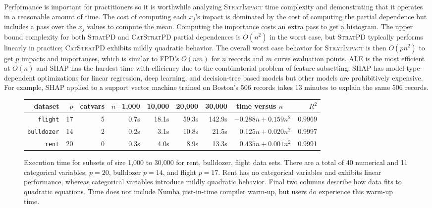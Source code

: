 \documentclass[11pt]{article}
\newcommand{\simp}{\fontfamily{cmr}\textsc{\small StratImpact}}
\newcommand{\spd}{\fontfamily{cmr}\textsc{\small StratPD}}
\newcommand{\cspd}{\fontfamily{cmr}\textsc{\small CatStratPD}}
\begin{document}
Performance is important for practitioners so it is worthwhile analyzing \simp{} time complexity and demonstrating that it operates in a reasonable amount of time.  The cost of computing each $x_j$'s impact is dominated by the cost of computing the partial dependence but includes a pass over the $x_j$ values to compute the mean. Computing the importance costs an extra pass to get a histogram. The upper bound  complexity for both \spd{} and \cspd{} partial dependences is $O(n^2)$ in the worst case, but \spd{} typically performs linearly in practice; \cspd{} exhibits mildly quadratic behavior.  The overall worst case behavior for \simp{} is then $O(p n^2)$ to get $p$ impacts and importances, which is  similar to FPD's $O(nm)$ for $n$ records and $m$ curve evaluation points.  ALE is the most efficient at $O(n)$ and SHAP has the hardest time with efficiency due to the combinatorial problem of feature subsetting. SHAP has model-type-dependent optimizations for linear regression, deep learning, and decision-tree based models but other models are prohibitively expensive. For example, SHAP applied to a support vector machine trained on Boston's 506 records takes 13 minutes to explain the same 506 records.

\begin{figure}\small
\centering
\begin{tabular}{r r r r r r r r r}
{\bf dataset} & $p$ & catvars & {\small $n$=1,000} & {\small 10,000} & {\small 20,000} & {\small 30,000} & time versus $n$~~ & $R^2$\\
\hline
{\tt\small flight} & 17 & 5 & 0.7s & 18.1s & 59.3s & 142.9s & {\small $-0.288 n + 0.159 n^2$} & {\small 0.9969}\\
{\tt\small bulldozer} & 14 & 2 & 0.2s & 3.1s & 10.8s & 21.5s & {\small $0.125 n + 0.020 n^2$} & {\small 0.9997}\\
{\tt\small rent} & 20 & 0 & 0.3s & 4.0s & 8.9s & 13.3s & {\small $0.435 n + 0.001 n^2$} & {\small 0.9991}\\
\end{tabular}
\caption{\small  Execution time for subsets of size 1,000 to 30,000 for rent, bulldozer, flight data sets.  There are a total of 40 numerical and 11 categorical variables: $p=20$, bulldozer $p=14$, and flight $p=17$. 
Rent has no categorical variables and exhibits linear performance, whereas categorical variables introduce mildly quadratic behavior. Final two columns describe how data fits to quadratic equations. Time does not include Numba just-in-time compiler warm-up, but users do experience this warm-up time.}
\label{fig:timing}
\end{figure}
\end{document}

